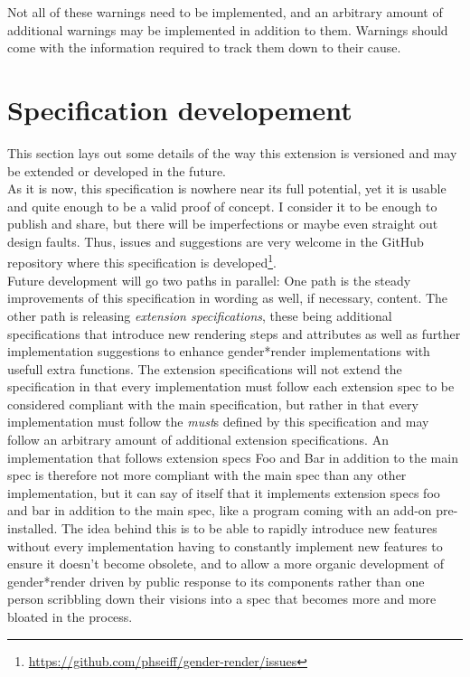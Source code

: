 \documentclass{article}
\newcommand{\GenderRender}{
    gender*render
}
\begin{document}
    Not all of these warnings need to be implemented, and an arbitrary amount of additional warnings may be implemented in addition to them.
    Warnings should come with the information required to track them down to their cause.

\section{Specification developement}

    This section lays out some details of the way this extension is versioned and may be extended or developed in the future.\\

    As it is now, this specification is nowhere near its full potential, yet it is usable and quite enough to be a valid proof of concept.
    I consider it to be enough to publish and share, but there will be imperfections or maybe even straight out design faults.
    Thus, issues and suggestions are very welcome in the GitHub repository where this specification is developed\footnote{\url{https://github.com/phseiff/gender-render/issues}}.\\

    Future development will go two paths in parallel: One path is the steady improvements of this specification in wording as well, if necessary, content.
    The other path is releasing \emph{extension specifications}, these being additional specifications that introduce new rendering steps and attributes as well as further implementation suggestions to enhance \GenderRender implementations with usefull extra functions.
    The extension specifications will not extend the specification in that every implementation must follow each extension spec to be considered compliant with the main specification, but rather in that every implementation must follow the \emph{must}s defined by this specification and may follow an arbitrary amount of additional extension specifications.
    An implementation that follows extension specs Foo and Bar in addition to the main spec is therefore not more compliant with the main spec than any other implementation, but it can say of itself that it implements extension specs foo and bar in addition to the main spec, like a program coming with an add-on pre-installed.
    The idea behind this is to be able to rapidly introduce new features without every implementation having to constantly implement new features to ensure it doesn't become obsolete, and to allow a more organic development of \GenderRender driven by public response to its components rather than one person scribbling down their visions into a spec that becomes more and more bloated in the process.\\
\end{document}
